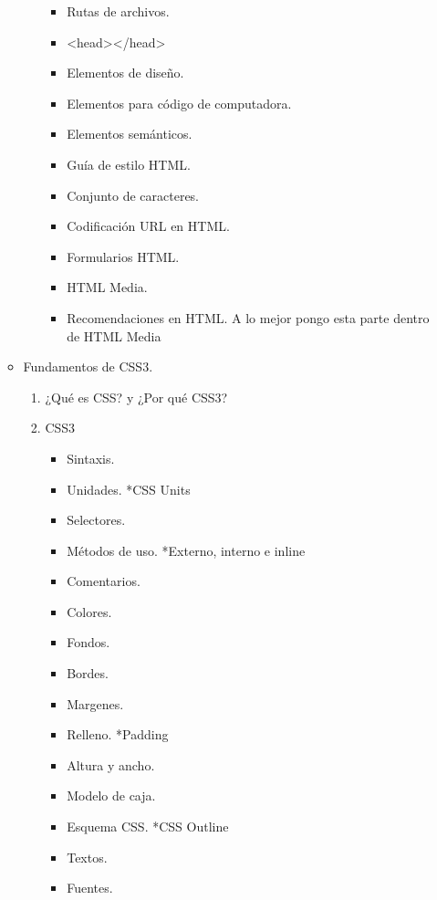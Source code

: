\documentclass[12pt, letterpaper]{article}
\begin{document}
\begin{enumerate}
\begin{itemize}
\begin{enumerate}
\begin{itemize}
                \item Rutas de archivos.
                \item <head></head>
                \item Elementos de diseño.
                \item Elementos para código de computadora.
                \item Elementos semánticos.
                \item Guía de estilo HTML.
                \item Conjunto de caracteres.
                \item Codificación URL en HTML.
                \item Formularios HTML.
                \item HTML Media.
                \item Recomendaciones en HTML. \newline*A lo mejor pongo esta parte dentro de HTML Media
            \end{itemize}
        \end{enumerate}
        \item Fundamentos de CSS3.
        \begin{enumerate}
            \item ¿Qué es CSS? y ¿Por qué CSS3?
            \item CSS3
            \begin{itemize}
                \item Sintaxis.
                \item Unidades. *CSS Units
                \item Selectores.
                \item Métodos de uso. *Externo, interno e inline
                \item Comentarios.
                \item Colores.
                \item Fondos.
                \item Bordes.
                \item Margenes.
                \item Relleno. *Padding
                \item Altura y ancho.
                \item Modelo de caja.
                \item Esquema CSS. *CSS Outline
                \item Textos.
                \item Fuentes.

\end{itemize}
\end{enumerate}
\end{itemize}
\end{enumerate}
\end{document}
